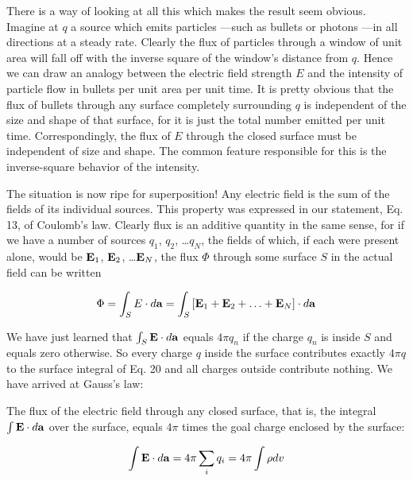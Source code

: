 There is a way of looking at all this which makes the result seem
obvious. Imagine at $q$ a source which emits particles ---such as
bullets or photons ---in all directions at a steady rate. Clearly the
flux of particles through a window of unit area will fall off with
the inverse square of the window's distance from $q$. Hence we can
draw an analogy between the electric field strength $E$ and the
intensity of particle flow in bullets per unit area per unit time. It
is pretty obvious that the flux of bullets through any surface
completely surrounding $q$ is independent of the size and shape of
that surface, for it is just the total number emitted per unit time.
Correspondingly, the flux of $E$ through the closed surface must be
independent of size 
and shape. The common feature
responsible for this is the inverse-square behavior of the intensity.

The situation is now ripe for superposition! Any electric field is
the sum of the fields of its individual sources. This property was
expressed in our statement, Eq. 13, of Coulomb's law. Clearly flux
is an additive quantity in the same sense, for if we have a number of
sources $q_1$, $q_2$, \ldots $q_N$, the fields of which, if each were
present alone, would be $\mathbf{E}_1$, $\mathbf{E}_2$, \ldots $\mathbf{E}_N$, the
flux $\Phi$ through some surface $S$ in the actual field can be written

\begin{equation}
  \Phi =  \int\nolimits_{S}{} E \cdot d
  \mathbf{a} =  \int\nolimits_{{S}}{}[\mathbf{E}_1 +
  \mathbf{E}_2 + \ldots + \mathbf{E}_N] \cdot d \mathbf{a} 
\end{equation}

We have just learned that $\int\nolimits_{S}{} \mathbf{E} \cdot d\mathbf{a}$
equals $4 \pi q_n$ if the charge $q_n$ is inside $S$ and
equals zero otherwise. So every charge $q$ inside the surface
contributes exactly $4 \pi q$ to the surface integral of Eq. 20 and
all charges outside contribute nothing. We have arrived at Gauss's
law:

\begin{framed}
The flux of the electric field  through any closed surface,
that is, the integral $\int {\ensuremath{\mathbf{E}}} \cdot d \mathbf{a}$ over
the surface, equals $4\pi$ times the goal charge enclosed by the
surface:

\begin{equation} 
  \int {\ensuremath{\mathbf{E}}} \cdot d \mathbf{a} =  4\pi \sum_i q_i =  4\pi \int \rho dv 
\end{equation}
\end{framed}

